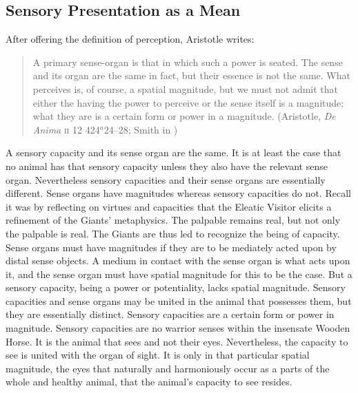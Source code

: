 
\subsection{Sensory Presentation as a Mean} %
\label{sub:sensory_presentation_as_a_mean}

After offering the definition of perception, Aristotle writes:
\begin{quote}
	A primary sense-organ is that in which such a power is seated. The sense and its organ are the same in fact, but their essence is not the same. What perceives is, of course, a spatial magnitude, but we must not admit that either the having the power to perceive or the sense itself is a magnitude; what they are is a certain form or power in a magnitude. (Aristotle, \emph{De Anima} \textsc{ii} 12 424\( ^{a} \)24--28; Smith in \citealt[43]{Barnes:1984uq})
\end{quote}
A sensory capacity and its sense organ are the same. It is at least the case that no animal has that sensory capacity unless they also have the relevant sense organ. Nevertheless sensory capacities and their sense organs are essentially different. Sense organs have magnitudes whereas sensory capacities do not. Recall it was by reflecting on virtues and capacities that the Eleatic Visitor elicits a refinement of the Giants' metaphysics. The palpable remains real, but not only the palpable is real. The Giants are thus led to recognize the being of capacity. Sense organs must have magnitudes if they are to be mediately acted upon by distal sense objects. A medium in contact with the sense organ is what acts upon it, and the sense organ must have spatial magnitude for this to be the case. But a sensory capacity, being a power or potentiality, lacks spatial magnitude. Sensory capacities and sense organs may be united in the animal that possesses them, but they are essentially distinct. Sensory capacities are a certain form or power in magnitude. Sensory capacities are no warrior senses within the insensate Wooden Horse. It is the animal that sees and not their eyes. Nevertheless, the capacity to see is united with the organ of sight. It is only in that particular spatial magnitude, the eyes that naturally and harmoniously occur as a parts of the whole and healthy animal, that the animal's capacity to see resides.


